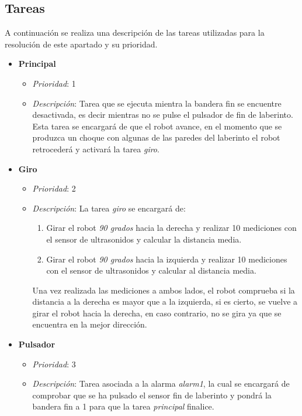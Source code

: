 \subsection{Tareas}

A continuación se realiza una descripción de las tareas utilizadas para la resolución de este apartado y su prioridad.

\begin{itemize}
	
	\item \textbf{Principal}
		\begin{itemize}
			\item \textit{Prioridad}: 1
			\item \textit{Descripción}: Tarea que se ejecuta mientra la bandera fin se encuentre desactivada, es decir mientras no se pulse el pulsador de fin de laberinto. Esta tarea se encargará de que el robot avance, en el momento que se produzca un choque con algunas de las paredes del laberinto el robot retrocederá y activará la tarea \textit{giro}.
		\end{itemize}
		
		\item \textbf{Giro}
		\begin{itemize}
			\item \textit{Prioridad}: 2
			\item \textit{Descripción}: La tarea \textit{giro} se encargará de:
			\begin{enumerate}
				\item Girar el robot \textit{90 grados} hacia la derecha y realizar 10 mediciones con el sensor de ultrasonidos y calcular la distancia media.
				\item Girar el robot \textit{90 grados} hacia la izquierda y realizar 10 mediciones con el sensor de ultrasonidos y calcular al distancia media.
			\end{enumerate}
			
			Una vez realizada las mediciones a ambos lados, el robot comprueba si la distancia a la derecha es mayor que a la izquierda, si es cierto, se vuelve a girar el robot hacia la derecha, en caso contrario, no se gira ya que se encuentra en la mejor dirección.
		\end{itemize}
		
		\item \textbf{Pulsador}
		\begin{itemize}
			\item \textit{Prioridad}: 3
			\item \textit{Descripción}: Tarea asociada a la alarma \textit{alarm1}, la cual se encargará de comprobar que se ha pulsado el sensor fin de laberinto y pondrá la bandera fin a 1 para que la tarea \textit{principal} finalice.
		\end{itemize}
			
\end{itemize}

